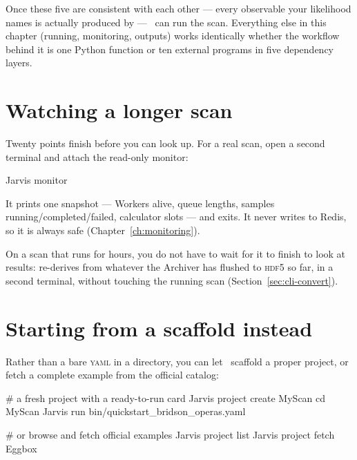 \begin{jtip}
Once these five are consistent with each other --- every observable your likelihood
names is actually produced by  --- \Jtwo\ can run the scan.
Everything else in this chapter (running, monitoring, outputs) works identically
whether the workflow behind it is one Python function or ten external programs in
five dependency layers.
\end{jtip}

\section{Watching a longer scan}
\label{sec:quickstart-monitor}

Twenty points finish before you can look up. For a real scan, open a second terminal and
attach the read-only monitor:

\begin{terminal}
\begin{jcmd}
Jarvis monitor
\end{jcmd}
\end{terminal}

It prints one snapshot --- Workers alive, queue lengths, samples running/completed/failed,
calculator slots --- and exits. It never writes to Redis, so it is always safe
(Chapter~\ref{ch:monitoring}).

\begin{jtip}
On a scan that runs for hours, you do not have to wait for it to finish to look at
results:  re-derives  from whatever
the Archiver has flushed to \textsc{hdf5} so far, in a second terminal, without
touching the running scan (Section~\ref{sec:cli-convert}).
\end{jtip}

\section{Starting from a scaffold instead}
\label{sec:quickstart-project}

Rather than a bare \textsc{yaml} in a directory, you can let \Jtwo\ scaffold a proper
project, or fetch a complete example from the official catalog:

\begin{terminal}
\begin{jcmd}
# a fresh project with a ready-to-run card
Jarvis project create MyScan
cd MyScan
Jarvis run bin/quickstart_bridson_operas.yaml

# or browse and fetch official examples
Jarvis project list
Jarvis project fetch Eggbox
\end{jcmd}
\end{terminal}

